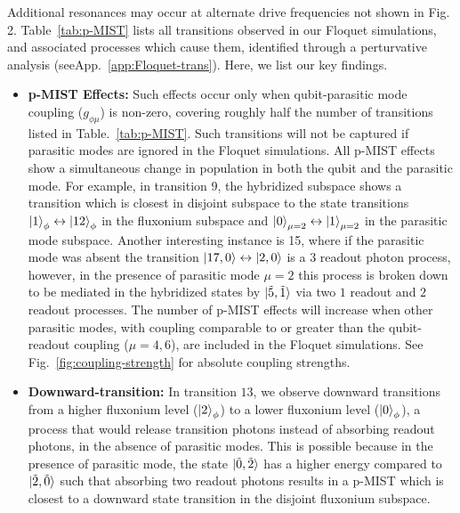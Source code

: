 \documentclass[prx,showpacs,notitlepage,twocolumn,superscriptaddress,nofootinbib,preprintnumbers,floatfix]{revtex4-2}
\begin{document}

Additional resonances may occur at alternate drive frequencies not shown in Fig. 2. Table~\ref{tab:p-MIST} lists all transitions observed  in our Floquet simulations, and associated processes which cause them, identified through a perturvative analysis (seeApp.~\ref{app:Floquet-trans}). Here, we list our key findings.
\begin{itemize}
\item \textbf{p-MIST Effects:} Such effects occur only when qubit-parasitic mode coupling ($g_{\phi\mu}$) is non-zero, covering roughly half the number of transitions listed in Table.~\ref{tab:p-MIST}. Such transitions will not be captured if parasitic modes are ignored in the Floquet simulations. All p-MIST effects show a simultaneous change in population in both the qubit and the parasitic mode. For example, in transition $9$, the hybridized subspace shows a transition which is closest in disjoint subspace to the state transitions $\ket{1}_\phi \leftrightarrow\ket{12}_\phi$ in the fluxonium subspace and $\ket{0}_{\mu=2} \leftrightarrow\ket{1}_{\mu=2}$ in the parasitic mode subspace. Another interesting instance is 15, where if the parasitic mode was absent the transition $\ket{17,0}\leftrightarrow \ket{2,0}$ is a $3$ readout photon process, however, in the presence of parasitic mode $\mu=2$ this process is broken down to be mediated in the hybridized states by $\ket{\tilde{5},\tilde{1}}$ via two $1$ readout and $2$ readout processes. The number of p-MIST effects will increase when other parasitic modes, with coupling comparable to or greater than the qubit-readout coupling ($\mu = 4, 6$), are included in the Floquet simulations. See Fig.~\ref{fig:coupling-strength} for absolute coupling strengths. 

\item\textbf{Downward-transition:} In transition $13$, we observe downward transitions from a higher fluxonium level ($\ket{2}_\phi$) to a lower fluxonium level ($\ket{0}_\phi$), a process that would release transition photons instead of absorbing readout photons, in the absence of parasitic modes. This is possible because in the presence of parasitic mode, the state $\ket{\tilde{0},\tilde{2}}$ has a higher energy compared to $\ket{\tilde{2},\tilde{0}}$ such that absorbing two readout photons results in a p-MIST which is closest to a downward state transition in the disjoint fluxonium subspace. 


\end{itemize}
\end{document}
